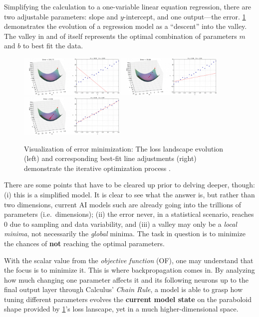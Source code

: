 \documentclass[conference]{IEEEtran}
\begin{document}
Simplifying the calculation to a one-variable linear equation regression, there are two adjustable parameters: slope and $y$-intercept, and one output---the error. \cref{fig:training_evolution} demonstrates the evolution of a regression model as a ``descent'' into the valley. The valley in and of itself represents the optimal combination of parameters $m$ and $b$ to best fit the data.

\begin{figure}[htbp]
    \centering
    \includegraphics[width=0.45\textwidth]{images/frame_00_delay-0.2s.png}
    \includegraphics[width=0.45\textwidth]{images/frame_04_delay-0.2s.png}
    \includegraphics[width=0.45\textwidth]{images/frame_19_delay-0.2s.png}
    \caption{Visualization of error minimization: The loss landscape evolution (left) and corresponding best-fit line adjustments (right) demonstrate the iterative optimization process \cite{fig-yennhi95zz_evolution}.}
    \label{fig:training_evolution}
\end{figure}

There are some points that have to be cleared up prior to delving deeper, though: (i) this is a simplified model. It is clear to see what the answer is, but rather than two dimensions, current AI models such are already going into the trillions of parameters (i.e.\ dimensions); (ii) the error never, in a statistical scenario, reaches 0 due to sampling and data variability, and (iii) a valley may only be a \textit{local minima}, not necessarily the \textit{global} minima. The task in question is to minimize the chances of \textbf{not} reaching the optimal parameters.

With the scalar value from the \textit{objective function} (OF), one may understand that the focus is to minimize it. This is where backpropagation comes in. By analyzing how much changing one parameter affects it and its following neurons up to the final output layer through Calculus' \textit{Chain Rule}, a model is able to grasp how tuning different parameters evolves the \textbf{current model state} on the paraboloid shape provided by \cref{fig:training_evolution}'s loss lanscape, yet in a much higher-dimensional space.
\end{document}
